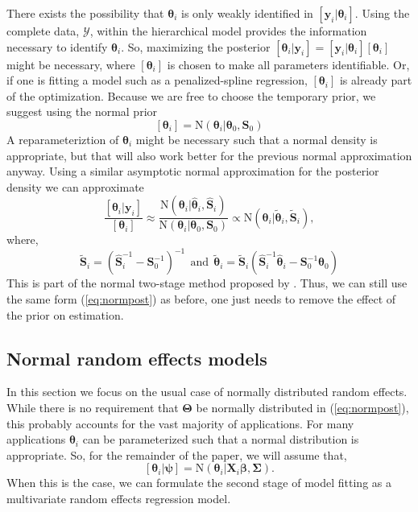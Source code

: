 \documentclass[12pt]{article}
\newcommand{\by}{\mathbf{y}}
\newcommand{\bt}{\boldsymbol{\theta}}
\newcommand{\bb}{\boldsymbol{\beta}}
\newcommand{\bT}{\boldsymbol{\Theta}}
\newcommand{\bp}{\boldsymbol{\psi}}
\newcommand{\bSig}{\boldsymbol{\Sigma}}
\newcommand{\bS}{\mathbf{S}}
\newcommand{\bX}{\mathbf{X}}
\newcommand{\fY}{\mathcal{Y}}
\begin{document}
There exists the possibility that $\bt_i$ is only weakly identified in $[\by_i|\bt_i]$. Using the complete data, $\fY$, within the hierarchical model provides the information necessary to identify $\bt_i$. So, maximizing the posterior $[\bt_i|\by_i] = [\by_i|\bt_i][\bt_i]$ might be necessary, where $[\bt_i]$ is chosen to make all parameters identifiable. Or, if one is fitting a model such as a penalized-spline regression, $[\bt_i]$ is already part of the optimization. Because we are free to choose the temporary prior, we suggest using the normal prior
\[
[\bt_i] = \text{N}(\bt_i|\bt_0, \bS_0)
\]
A reparameteriztion of $\bt_i$ might be necessary such that a normal density is appropriate, but that will also work better for the previous normal approximation anyway. Using a similar asymptotic normal approximation for the posterior density we can approximate
\begin{equation}
\label{eq:pseudo.prior}
\frac{[\bt_i|\by_i]}{[\bt_i]} \approx \frac{\text{N}(\bt_i|\hat{\bt}_i, \hat{\bS}_i)}{\text{N}(\bt_i|\bt_0, \bS_0)} \propto \text{N}(\bt_i|\tilde{\bt}_i, \tilde{\bS}_i),
\end{equation}
where,
\begin{equation}
\label{eq:pprior.remove}
\tilde{\bS}_i = \left(\hat{\bS}_i^{-1} - \bS_0^{-1}\right)^{-1} 
\ \ \text{and}\ \ 
\tilde{\bt}_i = \tilde{\bS}_i \left(  \hat{\bS}_i^{-1}\hat{\bt}_i -  \bS_0^{-1}\bt_0\right)
\end{equation}
This is part of the normal two-stage method proposed by \citet{goudie2019joining}. Thus, we can still use the same form (\ref{eq:normpost}) as before, one just needs to remove the effect of the prior on estimation. 


\subsection{Normal random effects models}

In this section we focus on the usual case of normally distributed random effects. While there is no requirement that $\bT$ be normally distributed in (\ref{eq:normpost}), this probably accounts for the vast majority of applications. For many applications $\bt_i$ can be parameterized such that a normal distribution is appropriate. So, for the remainder of the paper, we will assume that, 
\[
[\bt_i|\bp] = \text{N}(\bt_i|\bX_i\bb, \bSig).
\]
When this is the case, we can formulate the second stage of model fitting as a multivariate random effects regression model. 
\end{document}
